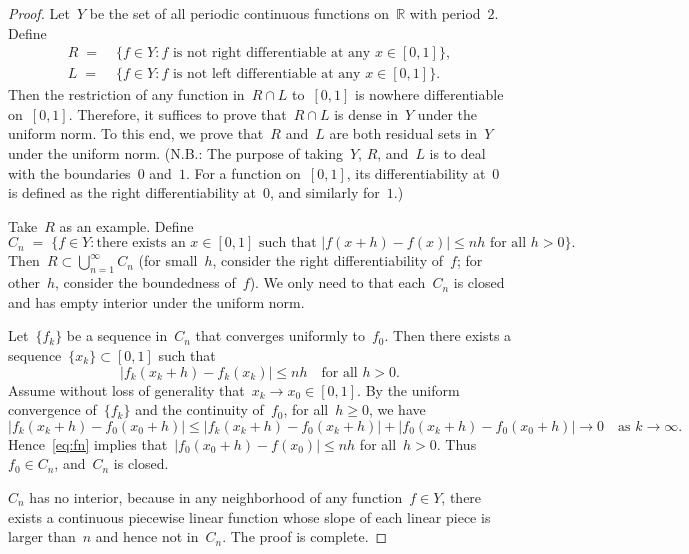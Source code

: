 \documentclass[11pt,a4paper]{article}  %
\theoremstyle{definition}
\newcommand{\RR}{\mathbb{R}}
\numberwithin{equation}{section}
\begin{document}
\begin{proof}
    Let~$Y$ be the set of all periodic continuous functions on~$\RR$ with period~$2$.
    Define
    \begin{align*}
        R \;=\; & \{f \in Y \mathrel{:} f \text{ is not right differentiable  at any } x \in [0,1]\},
        \\
        L \;=\; & \{f \in Y \mathrel{:} f \text{ is not left differentiable  at any } x \in [0,1]\}.
    \end{align*}
    Then the restriction of any function in~$R\cap L$ to~$[0,1]$ is nowhere differentiable
    on~$[0,1]$.
    Therefore, it suffices to prove that~$R \cap L$ is dense in~$Y$ under the uniform norm.
    To this end, we prove that~$R$ and~$L$ are both residual sets in~$Y$ under the uniform norm.
    (N.B.: The purpose of taking~$Y$, $R$, and~$L$ is to deal with the boundaries~$0$ and~$1$.
    For a function on~$[0,1]$, its differentiability at~$0$ is defined as the right
differentiability at~$0$, and similarly for~$1$.)

    Take~$R$ as an example.
    Define
    \[
        C_n \;=\; \{f \in Y \mathrel{:} \text{there exists an }x\in[0,1] \text{ such that } |f(x+h)
        - f(x)| \le nh \text{ for all } h> 0\}.
    \]
    Then~$R \subset \bigcup_{n=1}^\infty C_n$ (for small~$h$, consider the right differentiability of~$f$; for
    other~$h$, consider the boundedness of~$f$). We only need to that each~$C_n$ is closed and has empty
    interior under the uniform norm.

    Let~$\{f_k\}$ be a sequence in~$C_n$ that converges uniformly to~$f_0$.
    Then there exists a
    sequence~$\{x_k\} \subset[0,1]$ such that
    \begin{equation}
        \label{eq:fn}
      |f_k(x_k+h) - f_k(x_k)| \le nh \quad \text{for all~} h>0.
    \end{equation}
    Assume without loss of generality that~$x_k\to x_0\in[0,1]$. By the uniform
convergence of~$\{f_k\}$ and the continuity of~$f_0$, for all~$h\ge 0$, we have
    \[
    |f_k(x_k + h)- f_0(x_0 + h)| \le |f_k(x_k + h) - f_0(x_k +h)| + |f_0(x_k + h) - f_0(x_0 +h)|
        \to 0 \quad \text{as } k\to \infty.
    \]
    Hence~\eqref{eq:fn} implies that~$|f_0(x_0+h) - f(x_0)| \le nh$ for all~$h>0$. Thus~$f_0\in C_n$,
    and~$C_n$ is closed.

    $C_n$ has no interior, because in any neighborhood of any function~$f\in Y$, there exists a
    continuous piecewise linear function whose slope of each linear piece is larger than~$n$ and
    hence not in~$C_n$. The proof is complete.
\end{proof}
\end{document}
